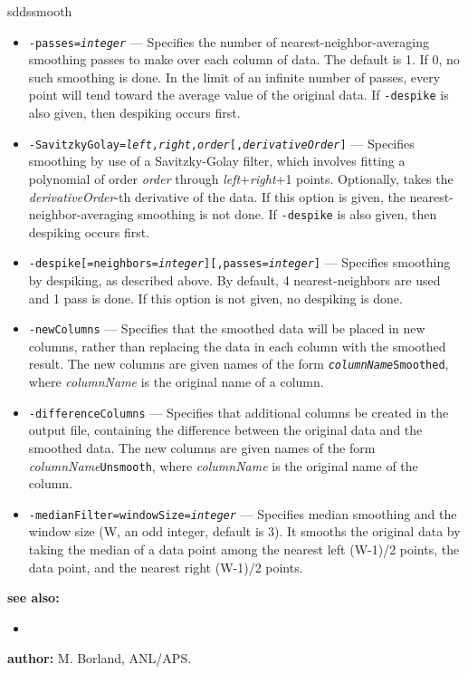 \begin{sddsprog}{sddssmooth}
\begin{itemize}
      \item {\tt -passes={\em integer}} --- Specifies the number of nearest-neighbor-averaging smoothing passes to make over each column of data. The default is 1. If 0, no such smoothing is done. In the limit of an infinite number of passes, every point will tend toward the average value of the original data. If {\tt -despike} is also given, then despiking occurs first.
      \item {\tt -SavitzkyGolay={\em left},{\em right},{\em order}[,{\em derivativeOrder}]} --- Specifies smoothing by use of a Savitzky-Golay filter, which involves fitting a polynomial of order {\em order} through {\em left}+{\em right}+1 points. Optionally, takes the {\em derivativeOrder}-th derivative of the data. If this option is given, the nearest-neighbor-averaging smoothing is not done. If {\tt -despike} is also given, then despiking occurs first.
      \item {\tt -despike[=neighbors={\em integer}][,passes={\em integer}]} --- Specifies smoothing by despiking, as described above. By default, 4 nearest-neighbors are used and 1 pass is done. If this option is not given, no despiking is done.
      \item {\tt -newColumns} --- Specifies that the smoothed data will be placed in new columns, rather than replacing the data in each column with the smoothed result. The new columns are given names of the form {\tt {\em columnName}Smoothed}, where {\em columnName} is the original name of a column.
      \item {\tt -differenceColumns} --- Specifies that additional columns be created in the output file, containing the difference between the original data and the smoothed data. The new columns are given names of the form {\em columnName}{\tt Unsmooth}, where {\em columnName} is the original name of the column.
      \item {\tt -medianFilter=windowSize={\em integer}} --- Specifies median smoothing and the window size (W, an odd integer, default is 3). It smooths the original data by taking the median of a data point among the nearest left (W-1)/2 points, the data point, and the nearest right (W-1)/2 points.
    \end{itemize}
  \item \textbf{see also:}
    \begin{itemize}
      \item {}
    \end{itemize}
  \item \textbf{author:} M. Borland, ANL/APS.
\end{sddsprog}
